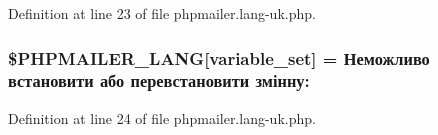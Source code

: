 Definition at line 23 of file phpmailer.\+lang-\/uk.\+php.

\subsubsection[{\texorpdfstring{\$\+P\+H\+P\+M\+A\+I\+L\+E\+R\+\_\+\+L\+A\+NG}{$PHPMAILER_LANG}}]{\setlength{\rightskip}{0pt plus 5cm}\$P\+H\+P\+M\+A\+I\+L\+E\+R\+\_\+\+L\+A\+NG\mbox{[}\textquotesingle{}variable\+\_\+set\textquotesingle{}\mbox{]} = \textquotesingle{}Неможливо встановити або перевстановити змінну\+: \textquotesingle{}}\hypertarget{phpmailer_8lang-uk_8php_af795debc7a739d038742691c358d9032}{}\label{phpmailer_8lang-uk_8php_af795debc7a739d038742691c358d9032}


Definition at line 24 of file phpmailer.\+lang-\/uk.\+php.

